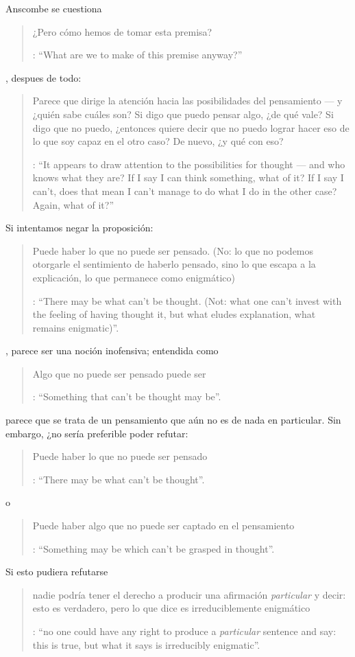 Anscombe se cuestiona \blockquote[{\Cite[7]{anscombe1981parmenides:pmc}}: \enquote{What are we to make of this premise anyway?}]{¿Pero cómo hemos de tomar esta premisa?}, despues de todo: \blockquote[{\Cite[7]{anscombe1981parmenides:pmc}}: \enquote{It appears to draw attention to the possibilities for thought --- and who knows what they are? If I say I can think something, what of it? If I say I can't, does that mean I can't manage to do what I do in the other case? Again, what of it?}]{Parece que dirige la atención hacia las posibilidades del pensamiento --- y ¿quién sabe cuáles son? Si digo que puedo pensar algo, ¿de qué vale? Si digo que no puedo, ¿entonces quiere decir que no puedo lograr hacer eso de lo que soy capaz en el otro caso? De nuevo, ¿y qué con eso?}. Si intentamos negar la proposición: \blockquote[{\Cite[7]{anscombe1981parmenides:pmc}}: \enquote{There may be what can't be thought. (Not: what one can't invest with the feeling of having thought it, but what eludes explanation, what remains enigmatic)}.]{Puede haber lo que no puede ser pensado. (No: lo que no podemos otorgarle el sentimiento de haberlo pensado, sino lo que escapa a la explicación, lo que permanece como enigmático)}, parece ser una noción inofensiva; entendida como \blockquote[{\Cite[7]{anscombe1981parmenides:pmc}}: \enquote{Something that can't be thought may be}.]{Algo que no puede ser pensado puede ser} parece que se trata de un pensamiento que aún no es de nada en particular. Sin embargo, ¿no sería preferible poder refutar: \blockquote[{\Cite[7]{anscombe1981parmenides:pmc}}: \enquote{There may be what can't be thought}.]{Puede haber lo que no puede ser pensado} o \blockquote[{\Cite[7]{anscombe1981parmenides:pmc}}: \enquote{Something may be which can't be grasped in thought}.]{Puede haber algo que no puede ser captado en el pensamiento}? Si esto pudiera refutarse \blockquote[{\Cite[7]{anscombe1981parmenides:pmc}}: \enquote{no one could have any right to produce a \emph{particular} sentence and say: this is true, but what it says is irreducibly enigmatic}.]{nadie podría tener el derecho a producir una afirmación \emph{particular} y decir: esto es verdadero, pero lo que dice es irreduciblemente enigmático}.

